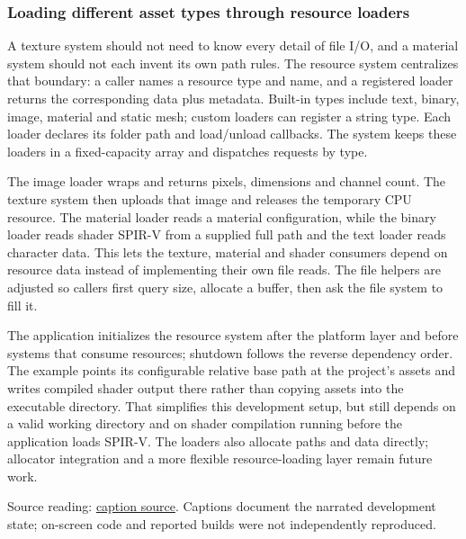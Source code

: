 \subsubsection{Loading different asset types through resource loaders}\label{06-engine-ii-ch027-loading-different-asset-types-through-resource-loaders}

\hypertarget{06-engine-ii-ch027-loading-different-asset-types-through-resource-loaders}{}

A texture system should not need to know every detail of file I/O, and a material system should not each invent its own path rules. The resource system centralizes that boundary: a caller names a resource type and name, and a registered loader returns the corresponding data plus metadata. Built-in types include text, binary, image, material and static mesh; custom loaders can register a string type. Each loader declares its folder path and load/unload callbacks. The system keeps these loaders in a fixed-capacity array and dispatches requests by type.

The image loader wraps  and returns pixels, dimensions and channel count. The texture system then uploads that image and releases the temporary CPU resource. The material loader reads a material configuration, while the binary loader reads shader SPIR-V from a supplied full path and the text loader reads character data. This lets the texture, material and shader consumers depend on resource data instead of implementing their own file reads. The file helpers are adjusted so callers first query size, allocate a buffer, then ask the file system to fill it.

The application initializes the resource system after the platform layer and before systems that consume resources; shutdown follows the reverse dependency order. The example points its configurable relative base path at the project's assets and writes compiled shader output there rather than copying assets into the executable directory. That simplifies this development setup, but still depends on a valid working directory and on shader compilation running before the application loads SPIR-V. The loaders also allocate paths and data directly; allocator integration and a more flexible resource-loading layer remain future work.

Source reading: \href{https://www.youtube.com/watch?v=ubin1HH_kqw}{caption source}. Captions document the narrated development state; on-screen code and reported builds were not independently reproduced.

